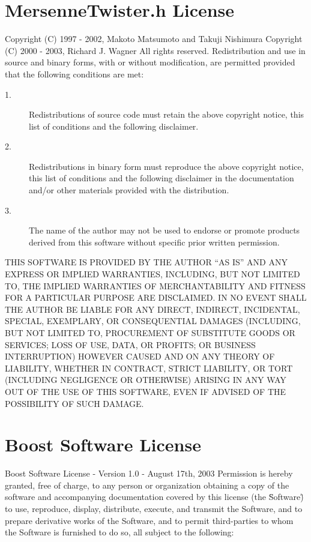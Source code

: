 \documentclass{scrartcl}
\begin{document}
\newpage
\begin{appendix}
\section{MersenneTwister.h License}
Copyright (C) 1997 - 2002, Makoto Matsumoto and Takuji Nishimura\newline
Copyright (C) 2000 - 2003, Richard J. Wagner\newline
All rights reserved.\newline
\newline
Redistribution and use in source and binary forms, with or without
modification, are permitted provided that the following conditions
are met:\newline
\begin{description}
\item[1.] Redistributions of source code must retain the above copyright\newline
   notice, this list of conditions and the following disclaimer.
\item[2.] Redistributions in binary form must reproduce the above copyright\newline
   notice, this list of conditions and the following disclaimer in the
   documentation and/or other materials provided with the distribution.
\item[3.] The name of the author may not be used to endorse or promote products
   derived from this software without specific prior written permission.\newline\newline
\end{description}

THIS SOFTWARE IS PROVIDED BY THE AUTHOR ``AS IS'' AND ANY EXPRESS OR
IMPLIED WARRANTIES, INCLUDING, BUT NOT LIMITED TO, THE IMPLIED WARRANTIES
OF MERCHANTABILITY AND FITNESS FOR A PARTICULAR PURPOSE ARE DISCLAIMED.
IN NO EVENT SHALL THE AUTHOR BE LIABLE FOR ANY DIRECT, INDIRECT,
INCIDENTAL, SPECIAL, EXEMPLARY, OR CONSEQUENTIAL DAMAGES (INCLUDING, BUT
NOT LIMITED TO, PROCUREMENT OF SUBSTITUTE GOODS OR SERVICES; LOSS OF USE,
DATA, OR PROFITS; OR BUSINESS INTERRUPTION) HOWEVER CAUSED AND ON ANY
THEORY OF LIABILITY, WHETHER IN CONTRACT, STRICT LIABILITY, OR TORT
(INCLUDING NEGLIGENCE OR OTHERWISE) ARISING IN ANY WAY OUT OF THE USE OF
THIS SOFTWARE, EVEN IF ADVISED OF THE POSSIBILITY OF SUCH DAMAGE.
\newpage
\section{Boost Software License}
Boost Software License - Version 1.0 - August 17th, 2003\newline
\newline
Permission is hereby granted, free of charge, to any person or organization
obtaining a copy of the software and accompanying documentation covered by
this license (the \"Software\") to use, reproduce, display, distribute,
execute, and transmit the Software, and to prepare derivative works of the
Software, and to permit third-parties to whom the Software is furnished to
do so, all subject to the following:\newline\newline


\end{appendix}
\end{document}
